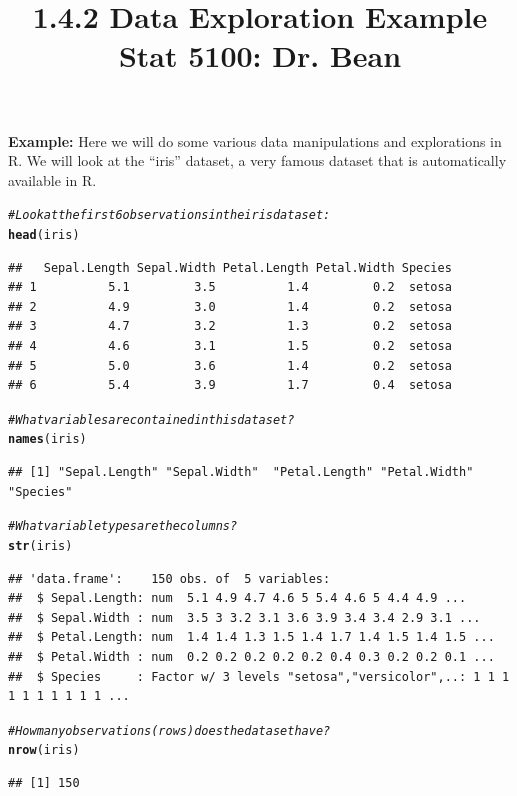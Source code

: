 \documentclass{article}\usepackage[]{graphicx}\usepackage[]{color}
\makeatletter
\newcommand{\hlcom}[1]{\textcolor[rgb]{0.678,0.584,0.686}{\textit{#1}}}%
\newcommand{\hlstd}[1]{\textcolor[rgb]{0.345,0.345,0.345}{#1}}%
\newcommand{\hlkwd}[1]{\textcolor[rgb]{0.737,0.353,0.396}{\textbf{#1}}}%
\newenvironment{kframe}{%
 \def\at@end@of@kframe{}%
 \ifinner\ifhmode%
  \def\at@end@of@kframe{\end{minipage}}%
  \begin{minipage}{\columnwidth}%
 \fi\fi%
 \def\FrameCommand##1{\hskip\@totalleftmargin \hskip-\fboxsep
 \colorbox{shadecolor}{##1}\hskip-\fboxsep
     \hskip-\linewidth \hskip-\@totalleftmargin \hskip\columnwidth}%
 \MakeFramed {\advance\hsize-\width
   \@totalleftmargin\z@ \linewidth\hsize
   \@setminipage}}%
 {\par\unskip\endMakeFramed%
 \at@end@of@kframe}
\newenvironment{knitrout}{}{} %
\makeatother
\begin{document}
\title{%
  1.4.2 Data Exploration Example \\
  \smallskip
  \large Stat 5100: Dr. Bean
}
\date{}

\maketitle

\textbf{Example: } Here we will do some various data manipulations and explorations in R. We will look at the ``iris'' dataset, a very famous dataset that is automatically available in R.

\begin{knitrout}
\color{fgcolor}\begin{kframe}
\begin{alltt}
\hlcom{# Look at the first 6 observations in the iris dataset:}
\hlkwd{head}\hlstd{(iris)}
\end{alltt}
\begin{verbatim}
##   Sepal.Length Sepal.Width Petal.Length Petal.Width Species
## 1          5.1         3.5          1.4         0.2  setosa
## 2          4.9         3.0          1.4         0.2  setosa
## 3          4.7         3.2          1.3         0.2  setosa
## 4          4.6         3.1          1.5         0.2  setosa
## 5          5.0         3.6          1.4         0.2  setosa
## 6          5.4         3.9          1.7         0.4  setosa
\end{verbatim}
\begin{alltt}
\hlcom{# What variables are contained in this dataset?}
\hlkwd{names}\hlstd{(iris)}
\end{alltt}
\begin{verbatim}
## [1] "Sepal.Length" "Sepal.Width"  "Petal.Length" "Petal.Width"  "Species"
\end{verbatim}
\begin{alltt}
\hlcom{# What variable types are the columns?}
\hlkwd{str}\hlstd{(iris)}
\end{alltt}
\begin{verbatim}
## 'data.frame':	150 obs. of  5 variables:
##  $ Sepal.Length: num  5.1 4.9 4.7 4.6 5 5.4 4.6 5 4.4 4.9 ...
##  $ Sepal.Width : num  3.5 3 3.2 3.1 3.6 3.9 3.4 3.4 2.9 3.1 ...
##  $ Petal.Length: num  1.4 1.4 1.3 1.5 1.4 1.7 1.4 1.5 1.4 1.5 ...
##  $ Petal.Width : num  0.2 0.2 0.2 0.2 0.2 0.4 0.3 0.2 0.2 0.1 ...
##  $ Species     : Factor w/ 3 levels "setosa","versicolor",..: 1 1 1 1 1 1 1 1 1 1 ...
\end{verbatim}
\begin{alltt}
\hlcom{# How many observations (rows) does the dataset have?}
\hlkwd{nrow}\hlstd{(iris)}
\end{alltt}
\begin{verbatim}
## [1] 150
\end{verbatim}
\end{kframe}
\end{knitrout}
\end{document}
